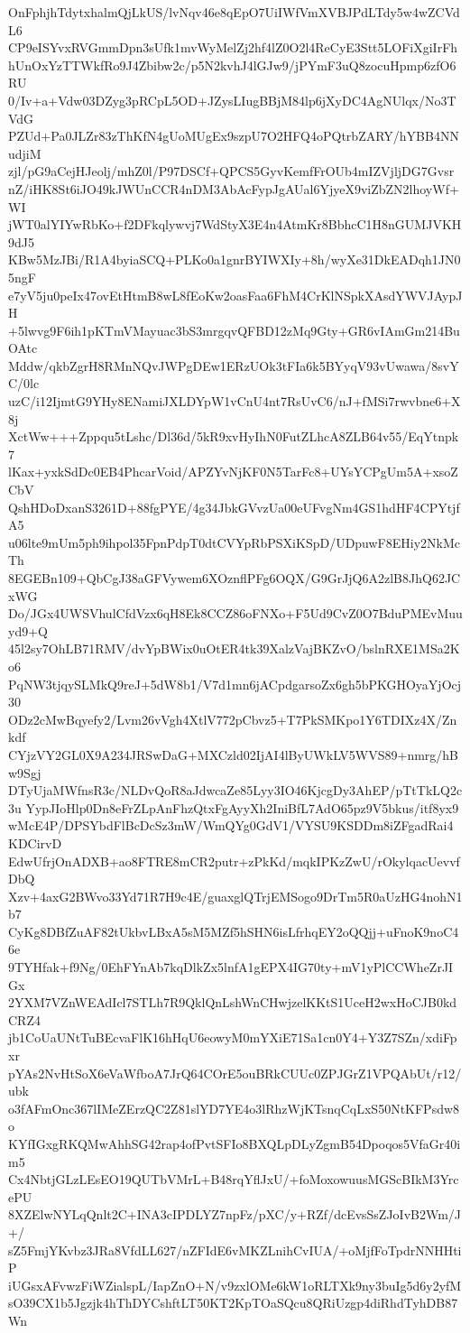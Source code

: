 OnFphjhTdytxhalmQjLkUS/lvNqv46e8qEpO7UiIWfVmXVBJPdLTdy5w4wZCVdL6
CP9eISYvxRVGmmDpn3sUfk1mvWyMelZj2hf4lZ0O2l4ReCyE3Stt5LOFiXgiIrFh
hUnOxYzTTWkfRo9J4Zbibw2c/p5N2kvhJ4lGJw9/jPYmF3uQ8zocuHpmp6zfO6RU
0/Iv+a+Vdw03DZyg3pRCpL5OD+JZysLIugBBjM84lp6jXyDC4AgNUlqx/No3TVdG
PZUd+Pa0JLZr83zThKfN4gUoMUgEx9szpU7O2HFQ4oPQtrbZARY/hYBB4NNudjiM
zjl/pG9aCejHJeolj/mhZ0l/P97DSCf+QPCS5GyvKemfFrOUb4mIZVjljDG7Gvsr
nZ/iHK8St6iJO49kJWUnCCR4nDM3AbAcFypJgAUal6YjyeX9viZbZN2lhoyWf+WI
jWT0alYIYwRbKo+f2DFkqlywvj7WdStyX3E4n4AtmKr8BbhcC1H8nGUMJVKH9dJ5
KBw5MzJBi/R1A4byiaSCQ+PLKo0a1gnrBYIWXIy+8h/wyXe31DkEADqh1JN05ngF
e7yV5ju0peIx47ovEtHtmB8wL8fEoKw2oasFaa6FhM4CrKlNSpkXAsdYWVJAypJH
+5lwvg9F6ih1pKTmVMayuac3bS3mrgqvQFBD12zMq9Gty+GR6vIAmGm214BuOAtc
Mddw/qkbZgrH8RMnNQvJWPgDEw1ERzUOk3tFIa6k5BYyqV93vUwawa/8svYC/0lc
uzC/i12IjmtG9YHy8ENamiJXLDYpW1vCnU4nt7RsUvC6/nJ+fMSi7rwvbne6+X8j
XctWw+++Zppqu5tLshc/Dl36d/5kR9xvHyIhN0FutZLhcA8ZLB64v55/EqYtnpk7
lKax+yxkSdDc0EB4PhcarVoid/APZYvNjKF0N5TarFc8+UYsYCPgUm5A+xsoZCbV
QshHDoDxanS3261D+88fgPYE/4g34JbkGVvzUa00eUFvgNm4GS1hdHF4CPYtjfA5
u06lte9mUm5ph9ihpol35FpnPdpT0dtCVYpRbPSXiKSpD/UDpuwF8EHiy2NkMcTh
8EGEBn109+QbCgJ38aGFVywem6XOznflPFg6OQX/G9GrJjQ6A2zlB8JhQ62JCxWG
Do/JGx4UWSVhulCfdVzx6qH8Ek8CCZ86oFNXo+F5Ud9CvZ0O7BduPMEvMuuyd9+Q
45l2sy7OhLB71RMV/dvYpBWix0uOtER4tk39XalzVajBKZvO/bslnRXE1MSa2Ko6
PqNW3tjqySLMkQ9reJ+5dW8b1/V7d1mn6jACpdgarsoZx6gh5bPKGHOyaYjOcj30
ODz2cMwBqyefy2/Lvm26vVgh4XtlV772pCbvz5+T7PkSMKpo1Y6TDIXz4X/Znkdf
CYjzVY2GL0X9A234JRSwDaG+MXCzld02IjAI4lByUWkLV5WVS89+nmrg/hBw9Sgj
DTyUjaMWfnsR3c/NLDvQoR8aJdwcaZe85Lyy3IO46KjcgDy3AhEP/pTtTkLQ2c3u
YypJIoHlp0Dn8eFrZLpAnFhzQtxFgAyyXh2IniBfL7AdO65pz9V5bkus/itf8yx9
wMcE4P/DPSYbdFlBcDcSz3mW/WmQYg0GdV1/VYSU9KSDDm8iZFgadRai4KDCirvD
EdwUfrjOnADXB+ao8FTRE8mCR2putr+zPkKd/mqkIPKzZwU/rOkylqacUevvfDbQ
Xzv+4axG2BWvo33Yd71R7H9c4E/guaxglQTrjEMSogo9DrTm5R0aUzHG4nohN1b7
CyKg8DBfZuAF82tUkbvLBxA5sM5MZf5hSHN6isLfrhqEY2oQQjj+uFnoK9noC46e
9TYHfak+f9Ng/0EhFYnAb7kqDlkZx5lnfA1gEPX4IG70ty+mV1yPlCCWheZrJIGx
2YXM7VZnWEAdIcl7STLh7R9QklQnLshWnCHwjzelKKtS1UceH2wxHoCJB0kdCRZ4
jb1CoUaUNtTuBEcvaFlK16hHqU6eowyM0mYXiE71Sa1cn0Y4+Y3Z7SZn/xdiFpxr
pYAs2NvHtSoX6eVaWfboA7JrQ64COrE5ouBRkCUUc0ZPJGrZ1VPQAbUt/r12/ubk
o3fAFmOnc367lIMeZErzQC2Z81slYD7YE4o3lRhzWjKTsnqCqLxS50NtKFPsdw8o
KYfIGxgRKQMwAhhSG42rap4ofPvtSFIo8BXQLpDLyZgmB54Dpoqos5VfaGr40im5
Cx4NbtjGLzLEsEO19QUTbVMrL+B48rqYflJxU/+foMoxowuusMGScBIkM3YrcePU
8XZElwNYLqQnlt2C+INA3cIPDLYZ7npFz/pXC/y+RZf/dcEvsSsZJoIvB2Wm/J+/
sZ5FmjYKvbz3JRa8VfdLL627/nZFIdE6vMKZLnihCvIUA/+oMjfFoTpdrNNHHtiP
iUGsxAFvwzFiWZialspL/IapZnO+N/v9zxlOMe6kW1oRLTXk9ny3buIg5d6y2yfM
sO39CX1b5Jgzjk4hThDYCshftLT50KT2KpTOaSQcu8QRiUzgp4diRhdTyhDB87Wn
